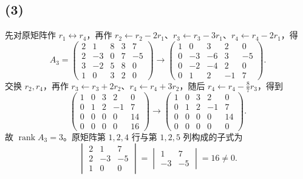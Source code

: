 \documentclass[11pt,a4paper,fontset=fandol]{ctexart}
\newcommand{\rk}{\operatorname{rank}}
\newcommand{\ans}[1]{\boxed{#1}}
\newcommand{\parttitle}[1]{\Needspace{7\baselineskip}\subsection*{#1}}
\begin{document}
\parttitle{(3)}
先对原矩阵作 $r_1\leftrightarrow r_4$，再作
$r_2\leftarrow r_2-2r_1$、$r_3\leftarrow r_3-3r_1$、$r_4\leftarrow r_4-2r_1$，得
\[
A_3=\begin{pmatrix}
2&1&8&3&7\\2&-3&0&7&-5\\3&-2&5&8&0\\1&0&3&2&0
\end{pmatrix}
\longrightarrow
\begin{pmatrix}
1&0&3&2&0\\0&-3&-6&3&-5\\0&-2&-4&2&0\\0&1&2&-1&7
\end{pmatrix}.
\]
交换 $r_2,r_4$，再作 $r_3\leftarrow r_3+2r_2$、$r_4\leftarrow r_4+3r_2$，随后
$r_4\leftarrow r_4-\frac87r_3$，得到
\[
\begin{pmatrix}
1&0&3&2&0\\0&1&2&-1&7\\0&0&0&0&14\\0&0&0&0&16
\end{pmatrix}
\longrightarrow
\begin{pmatrix}
1&0&3&2&0\\0&1&2&-1&7\\0&0&0&0&14\\0&0&0&0&0
\end{pmatrix}.
\]
故 $\ans{\rk A_3=3}$。原矩阵第 $1,2,4$ 行与第 $1,2,5$ 列构成的子式为
\[
\ans{\begin{vmatrix}2&1&7\\2&-3&-5\\1&0&0\end{vmatrix}
=\begin{vmatrix}1&7\\-3&-5\end{vmatrix}=16\ne0}.
\]

\newpage
\end{document}
